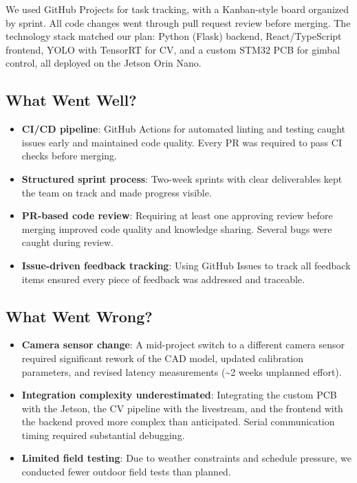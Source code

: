\documentclass{article}
\begin{document}
We used GitHub Projects for task tracking, with a Kanban-style board organized
by sprint. All code changes went through pull request review before merging.
The technology stack matched our plan: Python (Flask) backend, React/TypeScript
frontend, YOLO with TensorRT for CV, and a custom STM32 PCB for gimbal control,
all deployed on the Jetson Orin Nano.

\subsection{What Went Well?}

\begin{itemize}
  \item \textbf{CI/CD pipeline}: GitHub Actions for automated linting and
        testing caught issues early and maintained code quality. Every PR was
        required to pass CI checks before merging.
  \item \textbf{Structured sprint process}: Two-week sprints with clear
        deliverables kept the team on track and made progress visible.
  \item \textbf{PR-based code review}: Requiring at least one approving review
        before merging improved code quality and knowledge sharing. Several bugs
        were caught during review.
  \item \textbf{Issue-driven feedback tracking}: Using GitHub Issues to track
        all feedback items ensured every piece of feedback was addressed and
        traceable.
\end{itemize}

\subsection{What Went Wrong?}

\begin{itemize}
  \item \textbf{Camera sensor change}: A mid-project switch to a different
        camera sensor required significant rework of the CAD model, updated
        calibration parameters, and revised latency measurements
        (\textasciitilde2 weeks unplanned effort).
  \item \textbf{Integration complexity underestimated}: Integrating the custom
        PCB with the Jetson, the CV pipeline with the livestream, and the frontend
        with the backend proved more complex than anticipated. Serial communication
        timing required substantial debugging.
  \item \textbf{Limited field testing}: Due to weather constraints and schedule
        pressure, we conducted fewer outdoor field tests than planned.
\end{itemize}
\end{document}
